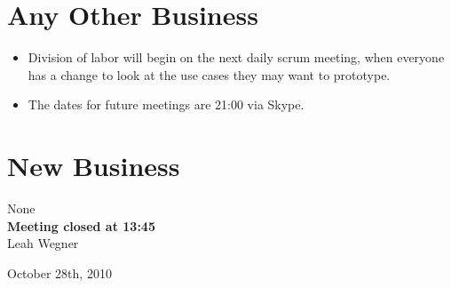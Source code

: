 \documentclass[12pt]{article}
\begin{document}
\section{Any Other Business}
\begin{itemize}
   \item Division of labor will begin on the next daily scrum meeting, when everyone has a change to look at the use cases they may want to prototype.
   \item The dates for future meetings are 21:00 via Skype.
\end{itemize}
   
\section{New Business}
None\\
   
\textbf{Meeting closed at 13:45} \\
 
Leah Wegner
 
October 28th, 2010
 
\end{document}
